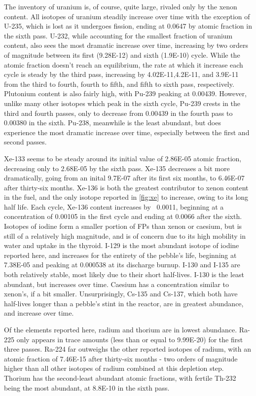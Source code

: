 The inventory of uranium is, of course, quite large, rivaled only by the xenon content.  All isotopes of uranium steadily increase over time with the exception of U-235, which is lost as it undergoes fission, ending at 0.0647 by atomic fraction in the sixth pass.  U-232, while accounting for the smallest fraction of uranium content, also sees the most dramatic increase over time, increasing by two orders of magnitude between its first (9.28E-12) and sixth (1.9E-10) cycle.  While the atomic fraction doesn't reach an equilibrium, the rate at which it increase each cycle is steady by the third pass, increasing by 4.02E-11,4.2E-11, and 3.9E-11 from the third to fourth, fourth to fifth, and fifth to sixth pass, respectively.  Plutonium content is also fairly high, with Pu-239 peaking at 0.00439.  However, unlike many other isotopes which peak in the sixth cycle, Pu-239 crests in the third and fourth passes, only to decrease from 0.00439 in the fourth pass to 0.00380 in the sixth.  Pu-238, meanwhile is the least abundant, but does experience the most dramatic increase over time, especially between the first and second passes.



Xe-133 seems to be steady around its initial value of 2.86E-05 atomic fraction, decreasing only to 2.68E-05 by the sixth pass.  Xe-135 decreases a bit more dramatically, going from an inital 9.7E-07 after its first six months, to  6.46E-07 after thirty-six months.  Xe-136 is both the greatest contributor to xenon content in the fuel, and the only isotope reported in \ref{fig:xe} to increase, owing to its long half life.  Each cycle, Xe-136 content increases by ~0.0011, beginning at a concentration of 0.00105 in the first cycle and ending at 0.0066 after the sixth.  Isotopes of iodine form a smaller portion of FPs than xenon or caesium, but is still of a relatively high magnitude, and is of concern due to its high mobility in water and uptake in the thyroid.  I-129 is the most abundant isotope of iodine reported here, and increases for the entirety of the pebble's life, beginning at 7.38E-05 and peaking at 0.000538 at its discharge burnup.  I-130 and I-135 are both relatively stable, most likely due to their short half-lives.  I-130 is the least abundant, but increases over time.  Caesium has a concentration similar to xenon's, if a bit smaller.  Unsurprisingly, Cs-135 and Cs-137, which both have half-lives longer than a pebble's stint in the reactor, are in greatest abundance, and increase over time.

Of the elements reported here, radium and thorium are in lowest abundance.  Ra-225 only appears in trace amounts (less than or equal to 9.99E-20) for the first three passes.  Ra-224 far outweighs the other reported isotopes of radium, with an atomic fraction of 7.46E-15 after thirty-six months - two orders of magnitude higher than all other isotopes of radium combined at this depletion step.  Thorium has the second-least abundant atomic fractions, with fertile Th-232 being the most abundant, at 8.8E-10 in the sixth pass.

